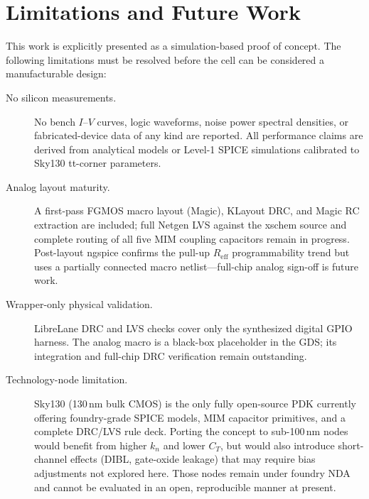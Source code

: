\documentclass[a4paper,fleqn]{cas-sc}
\newcommand{\Reff}{R_{\mathrm{eff}}}
\newcommand{\kn}{k_{n}}
\newcommand{\CT}{C_{T}}
\begin{document}
\section{Limitations and Future Work}
\label{sec:limitations}

This work is explicitly presented as a simulation-based proof of concept. The following
limitations must be resolved before the cell can be considered a manufacturable design:

\begin{description}
  \item[No silicon measurements.]
        No bench $I$--$V$ curves, logic waveforms, noise power spectral densities, or
        fabricated-device data of any kind are reported. All performance claims are
        derived from analytical models or Level-1 SPICE simulations calibrated to
        Sky130 tt-corner parameters.

  \item[Analog layout maturity.]
        A first-pass FGMOS macro layout (Magic), KLayout DRC, and Magic RC extraction
        are included; full Netgen LVS against the xschem source and complete
        routing of all five MIM coupling capacitors remain in progress. Post-layout
        ngspice confirms the pull-up $\Reff$ programmability trend but uses a
        partially connected macro netlist---full-chip analog sign-off is future work.

  \item[Wrapper-only physical validation.]
        LibreLane DRC and LVS checks cover only the synthesized digital GPIO harness.
        The analog macro is a black-box placeholder in the GDS; its integration and
        full-chip DRC verification remain outstanding.

  \item[Technology-node limitation.]
        Sky130 (130\,nm bulk CMOS) is the only fully open-source PDK currently offering
        foundry-grade SPICE models, MIM capacitor primitives, and a complete DRC/LVS
        rule deck. Porting the concept to sub-100\,nm nodes would benefit from higher
        $\kn$ and lower $\CT$, but would also introduce short-channel effects (DIBL,
        gate-oxide leakage) that may require bias adjustments not explored here.
        Those nodes remain under foundry NDA and cannot be evaluated in an open,
        reproducible manner at present.
\end{description}
\end{document}
